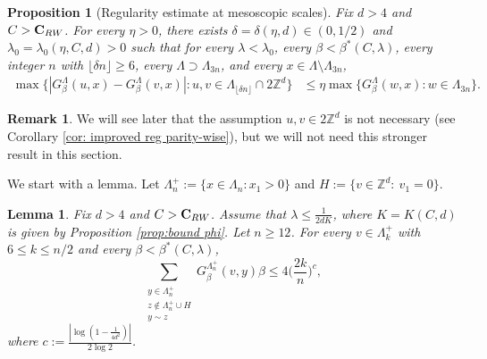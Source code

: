 \documentclass[11pt,a4paper]{article}
\numberwithin{equation}{section}
\theoremstyle{plain}
\newtheorem{Lem}[Thm]{Lemma}
\newtheorem{Prop}[Thm]{Proposition}
\theoremstyle{definition}
\newtheorem{Rem}[Thm]{Remark}
\newcommand\bfC{\mathbf{C}}
\begin{document}
\begin{Prop}[Regularity estimate at mesoscopic scales]\label{prop:regularity}
Fix $d>4$ and $C>\bfC_{\rm RW}$. For every $\eta>0$, there exists $\delta=\delta(\eta,d)\in(0,1/2)$ and $\lambda_0=\lambda_0(\eta,C,d)>0$ such that for every $\lambda<\lambda_0$, every $\beta<\beta^*(C,\lambda)$, every integer $n$ with $\lfloor \delta n\rfloor\geq 6$, every $\Lambda\supset \Lambda_{3n}$, and every $x\in \Lambda\setminus\Lambda_{3n}$, 
\begin{align}
\max\big\{|G_\beta^\Lambda(u,x)-G_\beta^\Lambda(v,x)|:u,v\in\Lambda_{\lfloor\delta n\rfloor}\cap 2\mathbb Z^d\big\}&\le \eta\max\big\{G_\beta^\Lambda(w,x):w\in \Lambda_{3n}\big\}.
\end{align}
\end{Prop}

\begin{Rem}
We will see later that the assumption $u,v\in 2\mathbb Z^d$ is not necessary (see Corollary \ref{cor: improved reg parity-wise}), but we will not need this stronger result in this section.
\end{Rem}
We start with a lemma. Let $\Lambda_n^+:=\{x\in \Lambda_n:x_1>0\}$ and $H:=\{v \in \mathbb Z^d: \: v_1=0\}$.
\begin{Lem}\label{lem:estimate half-space}
Fix $d>4$ and $C>\bfC_{\rm RW}$. Assume that $\lambda\leq \tfrac{1}{2dK}$, where $K=K(C,d)$ is given by Proposition \textup{\ref{prop:bound phi}}. Let $n\geq 12$. For every $v\in \Lambda_k^+$ with $6\le k\le n/2$ and every $\beta<\beta^*(C,\lambda)$, 
\begin{equation}
\sum_{\substack{y \in \Lambda_n^+\\ z\notin \Lambda_n^+\cup H\\ y\sim z}}G_\beta^{\Lambda_n^+}(v,y)\beta \le 4 \Big(\frac {2k}n\Big)^c,
\end{equation}
where $c:=\tfrac{|\log (1-\tfrac{1}{4d^2})|}{2\log 2}$.
\end{Lem}
\end{document}
